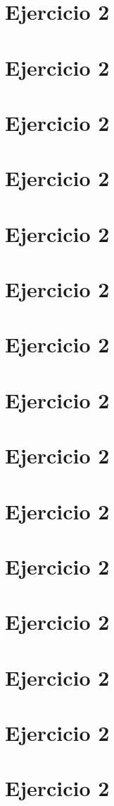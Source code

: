 \documentclass[%
 reprint,
 amsmath,amssymb,
 aps,
]{revtex4-1}
\begin{document}
\section{Ejercicio 2}
\section{Ejercicio 2}
\section{Ejercicio 2}
\section{Ejercicio 2}
\section{Ejercicio 2}
\section{Ejercicio 2}
\section{Ejercicio 2}
\section{Ejercicio 2}
\section{Ejercicio 2}
\section{Ejercicio 2}
\section{Ejercicio 2}
\section{Ejercicio 2}
\section{Ejercicio 2}
\section{Ejercicio 2}
\section{Ejercicio 2}
\end{document}
